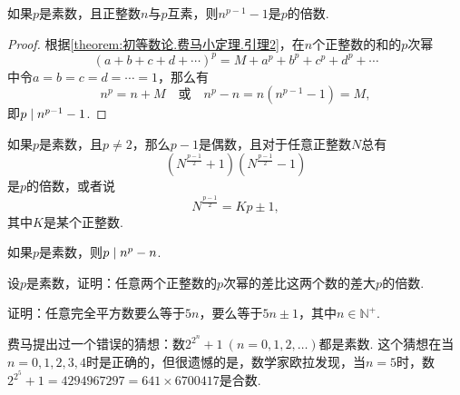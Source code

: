 \begin{theorem}[费马小定理]\label{theorem:初等数论.费马小定理}
如果\(p\)是素数，且正整数\(n\)与\(p\)互素，则\(n^{p-1}-1\)是\(p\)的倍数.
\begin{proof}
根据\cref{theorem:初等数论.费马小定理.引理2}，在\(n\)个正整数的和的\(p\)次幂\[
(a+b+c+d+\dotsb)^p = M + a^p + b^p + c^p + d^p + \dotsb
\]中令\(a=b=c=d=\dotsb=1\)，那么有\[
n^p = n + M
\quad\text{或}\quad
n^p - n = n(n^{p-1}-1) = M,
\]即\(\truediv{n^{p-1}-1}{p}\).
\end{proof}
\end{theorem}

\begin{corollary}
如果\(p\)是素数，且\(p\neq2\)，那么\(p-1\)是偶数，且对于任意正整数\(N\)总有\[
\left(N^{\frac{p-1}{2}}+1\right)
\left(N^{\frac{p-1}{2}}-1\right)
\]是\(p\)的倍数，或者说\[
N^{\frac{p-1}{2}} = Kp\pm1,
\]其中\(K\)是某个正整数.
\end{corollary}

\begin{corollary}[费马小定理']
如果\(p\)是素数，则\(\truediv{n^p-n}{p}\).
\end{corollary}

\begin{example}
设\(p\)是素数，证明：任意两个正整数的\(p\)次幂的差比这两个数的差大\(p\)的倍数.
\end{example}

\begin{example}
证明：任意完全平方数要么等于\(5n\)，要么等于\(5n\pm1\)，其中\(n\in\mathbb{N}^+\).
\end{example}

\begin{example}[费马猜想]
费马提出过一个错误的猜想：数\(2^{2^n}+1\ (n=0,1,2,\dotsc)\)都是素数.
这个猜想在当\(n=0,1,2,3,4\)时是正确的，但很遗憾的是，数学家欧拉发现，当\(n=5\)时，数\(2^{2^5}+1 = 4294967297 = 641 \times 6700417\)是合数.
\end{example}

\endgroup
